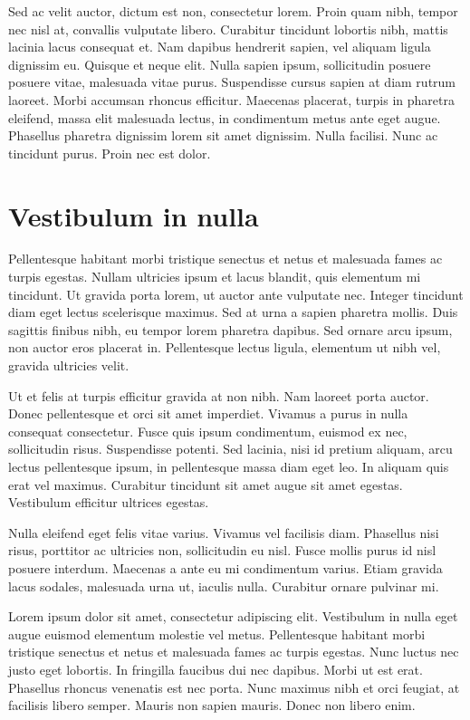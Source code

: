 Sed ac velit auctor, dictum est non, consectetur lorem. Proin quam nibh, tempor nec nisl at, convallis vulputate libero. Curabitur tincidunt lobortis nibh, mattis lacinia lacus consequat et. Nam dapibus hendrerit sapien, vel aliquam ligula dignissim eu. Quisque et neque elit. Nulla sapien ipsum, sollicitudin posuere posuere vitae, malesuada vitae purus. Suspendisse cursus sapien at diam rutrum laoreet. Morbi accumsan rhoncus efficitur. Maecenas placerat, turpis in pharetra eleifend, massa elit malesuada lectus, in condimentum metus ante eget augue. Phasellus pharetra dignissim lorem sit amet dignissim. Nulla facilisi. Nunc ac tincidunt purus. Proin nec est dolor.

\section{Vestibulum in nulla}
Pellentesque habitant morbi tristique senectus et netus et malesuada fames ac turpis egestas. Nullam ultricies ipsum et lacus blandit, quis elementum mi tincidunt. Ut gravida porta lorem, ut auctor ante vulputate nec. Integer tincidunt diam eget lectus scelerisque maximus. Sed at urna a sapien pharetra mollis. Duis sagittis finibus nibh, eu tempor lorem pharetra dapibus. Sed ornare arcu ipsum, non auctor eros placerat in. Pellentesque lectus ligula, elementum ut nibh vel, gravida ultricies velit.

Ut et felis at turpis efficitur gravida at non nibh. Nam laoreet porta auctor. Donec pellentesque et orci sit amet imperdiet. Vivamus a purus in nulla consequat consectetur. Fusce quis ipsum condimentum, euismod ex nec, sollicitudin risus. Suspendisse potenti. Sed lacinia, nisi id pretium aliquam, arcu lectus pellentesque ipsum, in pellentesque massa diam eget leo. In aliquam quis erat vel maximus. Curabitur tincidunt sit amet augue sit amet egestas. Vestibulum efficitur ultrices egestas.

Nulla eleifend eget felis vitae varius. Vivamus vel facilisis diam. Phasellus nisi risus, porttitor ac ultricies non, sollicitudin eu nisl. Fusce mollis purus id nisl posuere interdum. Maecenas a ante eu mi condimentum varius. Etiam gravida lacus sodales, malesuada urna ut, iaculis nulla. Curabitur ornare pulvinar mi.

Lorem ipsum dolor sit amet, consectetur adipiscing elit. Vestibulum in nulla eget augue euismod elementum molestie vel metus. Pellentesque habitant morbi tristique senectus et netus et malesuada fames ac turpis egestas. Nunc luctus nec justo eget lobortis. In fringilla faucibus dui nec dapibus. Morbi ut est erat. Phasellus rhoncus venenatis est nec porta. Nunc maximus nibh et orci feugiat, at facilisis libero semper. Mauris non sapien mauris. Donec non libero enim.

